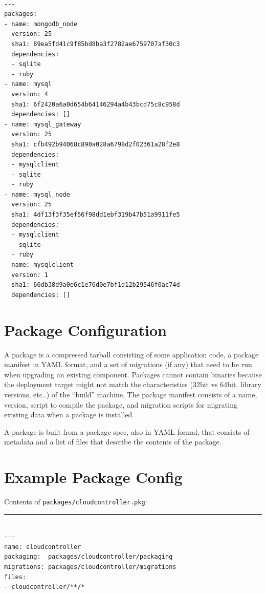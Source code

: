 \begin{adjustwidth}{2.5em}{2.5em}
\begin{verbatim}

--- 
packages:
- name: mongodb_node
  version: 25
  sha1: 89ea5fd41c9f85bd8ba3f2782ae6759707af30c3
  dependencies: 
  - sqlite
  - ruby
- name: mysql
  version: 4
  sha1: 6f2420a6a0d654b64146294a4b43bcd75c8c958d
  dependencies: []
- name: mysql_gateway
  version: 25
  sha1: cfb492b94068c890a028a6798d2f02361a28f2e8
  dependencies: 
  - mysqlclient
  - sqlite
  - ruby
- name: mysql_node
  version: 25
  sha1: 4df13f3f35ef56f98dd1ebf319b47b51a9911fe5
  dependencies: 
  - mysqlclient
  - sqlite
  - ruby
- name: mysqlclient
  version: 1
  sha1: 66db38d9a0e6c1e76d0e7bf1d12b29546f0ac74d
  dependencies: []

\end{verbatim}
\end{adjustwidth}

\section{Package Configuration}
\label{packageconfiguration}

A package is a compressed tarball consisting of some application code, a package manifest in YAML format, and a set of migrations (if any) that need to be run when upgrading an existing component. Packages cannot contain binaries because the deployment target might not match the characteristics (32bit vs 64bit, library versions, etc..) of the ``build'' machine. The package manifest consists of a name, version, script to compile the package, and migration scripts for migrating existing data when a package is installed.

A package is built from a package spec, also in YAML formal, that consists of metadata and a list of files that describe the contents of the package.

\section{Example Package Config}
\label{examplepackageconfig}

Contents of \texttt{packages\slash cloudcontroller.pkg}:

\begin{center}\rule{3in}{0.4pt}\end{center}


\begin{adjustwidth}{2.5em}{2.5em}
\begin{verbatim}

---
name: cloudcontroller
packaging:  packages/cloudcontroller/packaging
migrations: packages/cloudcontroller/migrations
files:
- cloudcontroller/**/*

\end{verbatim}
\end{adjustwidth}

